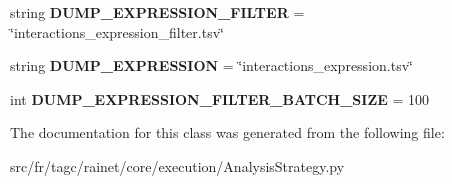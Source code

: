\begin{DoxyCompactItemize}
\item 
\hypertarget{classsrc_1_1fr_1_1tagc_1_1rainet_1_1core_1_1execution_1_1AnalysisStrategy_1_1AnalysisStrategy_a94d05e5c8b5236231c62e7248f69db06}{string {\bfseries D\-U\-M\-P\-\_\-\-E\-X\-P\-R\-E\-S\-S\-I\-O\-N\-\_\-\-F\-I\-L\-T\-E\-R} = \char`\"{}interactions\-\_\-expression\-\_\-filter.\-tsv\char`\"{}}\label{classsrc_1_1fr_1_1tagc_1_1rainet_1_1core_1_1execution_1_1AnalysisStrategy_1_1AnalysisStrategy_a94d05e5c8b5236231c62e7248f69db06}

\item 
\hypertarget{classsrc_1_1fr_1_1tagc_1_1rainet_1_1core_1_1execution_1_1AnalysisStrategy_1_1AnalysisStrategy_a3b3f118c83af80dda56406bb1802b85e}{string {\bfseries D\-U\-M\-P\-\_\-\-E\-X\-P\-R\-E\-S\-S\-I\-O\-N} = \char`\"{}interactions\-\_\-expression.\-tsv\char`\"{}}\label{classsrc_1_1fr_1_1tagc_1_1rainet_1_1core_1_1execution_1_1AnalysisStrategy_1_1AnalysisStrategy_a3b3f118c83af80dda56406bb1802b85e}

\item 
\hypertarget{classsrc_1_1fr_1_1tagc_1_1rainet_1_1core_1_1execution_1_1AnalysisStrategy_1_1AnalysisStrategy_a383d323d89a2701c523d4a5aeebdc1eb}{int {\bfseries D\-U\-M\-P\-\_\-\-E\-X\-P\-R\-E\-S\-S\-I\-O\-N\-\_\-\-F\-I\-L\-T\-E\-R\-\_\-\-B\-A\-T\-C\-H\-\_\-\-S\-I\-Z\-E} = 100}\label{classsrc_1_1fr_1_1tagc_1_1rainet_1_1core_1_1execution_1_1AnalysisStrategy_1_1AnalysisStrategy_a383d323d89a2701c523d4a5aeebdc1eb}

\end{DoxyCompactItemize}


The documentation for this class was generated from the following file\-:\begin{DoxyCompactItemize}
\item 
src/fr/tagc/rainet/core/execution/Analysis\-Strategy.\-py\end{DoxyCompactItemize}
